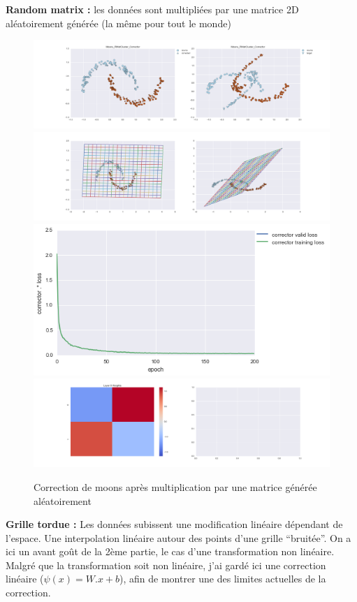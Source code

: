 {\Large \textbf{Random matrix :}} les données sont multipliées par une matrice 2D aléatoirement générée
 (la même pour tout le monde)

\begin{figure}[H] %
\centering
\includegraphics[width=\linewidth]{fig/24-05-2016/moons/Moons_RMatCluster_Corrector-DATA.png}
\includegraphics[width=\linewidth]{fig/24-05-2016/moons/Moons_RMatCluster_Corrector-GridCheck.png}
\includegraphics[width=0.45\linewidth]{fig/24-05-2016/moons/Moons_RMatCluster_Corrector-Learning_curve.png}
\includegraphics[width=\linewidth]{fig/24-05-2016/moons/Moons_RMatCluster_Corrector-W.png}
\caption{Correction de moons après multiplication par une matrice générée aléatoirement}
\label{fig:recap-moons-RMat-cluster}
\end{figure}

{\Large \textbf{Grille tordue :}} Les données subissent une modification linéaire dépendant de l'espace.
Une interpolation linéaire autour des points d'une grille ``bruitée''.
On a ici un avant goût de la 2ème partie, le cas d'une transformation non linéaire.
Malgré que la transformation soit non linéaire, j'ai gardé ici une correction linéaire ($\psi(x) = W.x+b$),
afin de montrer une des limites actuelles de la correction.

